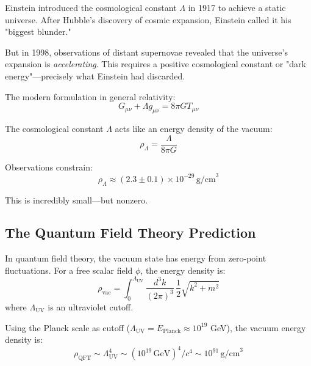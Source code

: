 \begin{level2}
Einstein introduced the cosmological constant $\Lambda$ in 1917\cite{einstein1917} to achieve a static universe. After Hubble's discovery of cosmic expansion\cite{hubble1929}, Einstein called it his "biggest blunder."

But in 1998, observations of distant supernovae\cite{riess1998,perlmutter1999} revealed that the universe's expansion is \textit{accelerating}. This requires a positive cosmological constant or "dark energy"—precisely what Einstein had discarded.

The modern formulation in general relativity:
\begin{equation}
G_{\mu\nu} + \Lambda g_{\mu\nu} = 8\pi G T_{\mu\nu}
\end{equation}

The cosmological constant $\Lambda$ acts like an energy density of the vacuum:
\begin{equation}
\rho_\Lambda = \frac{\Lambda}{8\pi G}
\end{equation}

Observations constrain\cite{planck2018}:
\begin{equation}
\boxed{\rho_\Lambda \approx (2.3 \pm 0.1) \times 10^{-29} \, \text{g/cm}^3}
\end{equation}

This is incredibly small—but nonzero.
\end{level2}

\subsection{The Quantum Field Theory Prediction}

\begin{defn}\label{def:vacuum-energy-qft}
In quantum field theory, the vacuum state has energy from zero-point fluctuations. For a free scalar field $\phi$, the energy density is:
\begin{equation}
\rho_{\text{vac}} = \int_0^{\Lambda_{\text{UV}}} \frac{d^3k}{(2\pi)^3} \, \frac{1}{2} \sqrt{k^2 + m^2}
\end{equation}
where $\Lambda_{\text{UV}}$ is an ultraviolet cutoff.
\end{defn}

\begin{proposition}\label{prop:qft-vacuum}
Using the Planck scale as cutoff ($\Lambda_{\text{UV}} = E_{\text{Planck}} \approx 10^{19}$ GeV), the vacuum energy density is:
\begin{equation}
\rho_{\text{QFT}} \sim \Lambda_{\text{UV}}^4 \sim (10^{19} \, \text{GeV})^4 / c^4 \sim 10^{91} \, \text{g/cm}^3
\end{equation}
\end{proposition}

